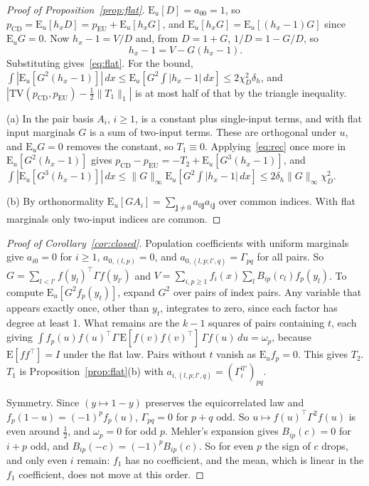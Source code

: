 \documentclass[10pt,a4paper]{article}
\newcommand{\pcd}{p_{\mathrm{CD}}}
\newcommand{\peu}{p_{\mathrm{EU}}}
\newcommand{\Eu}{\mathrm{E}_u}
\newcommand{\TV}{\mathrm{TV}}
\theoremstyle{upright}
\begin{document}
\begin{proof}[Proof of Proposition~\ref{prop:flat}]
$\Eu[D]=a_{00}=1$, so $\pcd=\Eu[h_xD]=\peu+\Eu[h_xG]$, and $\Eu[h_xG]=\Eu[(h_x-1)G]$ since $\Eu G=0$. Now $h_x-1=V/D$ and, from $D=1+G$, $1/D=1-G/D$, so
\begin{equation}\label{eq:rec}
h_x-1=V-G(h_x-1).
\end{equation}
Substituting gives~\eqref{eq:flat}. For the bound, $\int|\Eu[G^2(h_x-1)]|\,dx\leq\Eu[G^2\int|h_x-1|\,dx]\leq2\chi_D^2\delta_h$, and $|\TV(\pcd,\peu)-\frac12\|T_1\|_1|$ is at most half of that by the triangle inequality.

(a) In the pair basis $A_i$, $i\geq1$, is a constant plus single-input terms, and with flat input marginals $G$ is a sum of two-input terms. These are orthogonal under $u$, and $\Eu G=0$ removes the constant, so $T_1\equiv0$. Applying~\eqref{eq:rec} once more in $\Eu[G^2(h_x-1)]$ gives $\pcd-\peu=-T_2+\Eu[G^3(h_x-1)]$, and $\int|\Eu[G^3(h_x-1)]|\,dx\leq\|G\|_\infty\Eu[G^2\int|h_x-1|\,dx]\leq2\delta_h\|G\|_\infty\chi_D^2$.

(b) By orthonormality $\Eu[GA_i]=\sum_{\mathbf{j}\neq0}a_{0\mathbf{j}}a_{i\mathbf{j}}$ over common indices. With flat marginals only two-input indices are common.
\end{proof}

\begin{proof}[Proof of Corollary~\ref{cor:closed}]
Population coefficients with uniform marginals give $a_{i0}=0$ for $i\geq1$, $a_{0,(l,p)}=0$, and $a_{0,(l,p;l',q)}=\Gamma_{pq}$ for all pairs. So $G=\sum_{l<l'}f(y_l)^\top \Gamma f(y_{l'})$ and $V=\sum_{i,p\geq1}f_i(x)\sum_lB_{ip}(c_l)f_p(y_l)$. To compute $\Eu[G^2f_p(y_t)]$, expand $G^2$ over pairs of index pairs. Any variable that appears exactly once, other than $y_t$, integrates to zero, since each factor has degree at least 1. What remains are the $k-1$ squares of pairs containing $t$, each giving $\int f_p(u)f(u)^\top \Gamma\,\mathrm{E}[f(v)f(v)^\top]\,\Gamma f(u)\,du=\omega_p$, because $\mathrm{E}[ff^\top]=I$ under the flat law. Pairs without $t$ vanish as $\Eu f_p=0$. This gives $T_2$. $T_1$ is Proposition~\ref{prop:flat}(b) with $a_{i,(l,p;l',q)}=(\Gamma^{ll'}_i)_{pq}$.

Symmetry. Since $(y\mapsto1-y)$ preserves the equicorrelated law and $f_p(1-u)=(-1)^pf_p(u)$, $\Gamma_{pq}=0$ for $p+q$ odd. So $u\mapsto f(u)^\top \Gamma^2f(u)$ is even around $\frac12$, and $\omega_p=0$ for odd $p$. Mehler's expansion gives $B_{ip}(c)=0$ for $i+p$ odd, and $B_{ip}(-c)=(-1)^pB_{ip}(c)$. So for even $p$ the sign of $c$ drops, and only even $i$ remain: $f_1$ has no coefficient, and the mean, which is linear in the $f_1$ coefficient, does not move at this order.
\end{proof}
\end{document}
